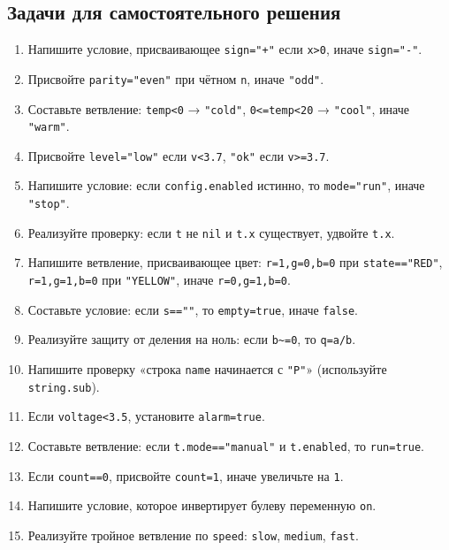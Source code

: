 \subsection*{Задачи для самостоятельного решения}
\begin{enumerate}
  \item Напишите условие, присваивающее \verb|sign="+"| если \verb|x>0|, иначе \verb|sign="-"|.
  \item Присвойте \verb|parity="even"| при чётном \verb|n|, иначе \verb|"odd"|.
  \item Составьте ветвление: \verb|temp<0| → \verb|"cold"|, \verb|0<=temp<20| → \verb|"cool"|, иначе \verb|"warm"|.
  \item Присвойте \verb|level="low"| если \verb|v<3.7|, \verb|"ok"| если \verb|v>=3.7|.
  \item Напишите условие: если \verb|config.enabled| истинно, то \verb|mode="run"|, иначе \verb|"stop"|.
  \item Реализуйте проверку: если \verb|t| не \verb|nil| и \verb|t.x| существует, удвойте \verb|t.x|.
  \item Напишите ветвление, присваивающее цвет: \verb|r=1,g=0,b=0| при \verb|state=="RED"|, \verb|r=1,g=1,b=0| при \verb|"YELLOW"|, иначе \verb|r=0,g=1,b=0|.
  \item Составьте условие: если \verb|s==""|, то \verb|empty=true|, иначе \verb|false|.
  \item Реализуйте защиту от деления на ноль: если \verb|b~=0|, то \verb|q=a/b|.
  \item Напишите проверку «строка \verb|name| начинается с \verb|"P"|» (используйте \verb|string.sub|).
  \item Если \verb|voltage<3.5|, установите \verb|alarm=true|.
  \item Составьте ветвление: если \verb|t.mode=="manual"| и \verb|t.enabled|, то \verb|run=true|.
  \item Если \verb|count==0|, присвойте \verb|count=1|, иначе увеличьте на \verb|1|.
  \item Напишите условие, которое инвертирует булеву переменную \verb|on|.
  \item Реализуйте тройное ветвление по \verb|speed|: \verb|slow|, \verb|medium|, \verb|fast|.
\end{enumerate}
